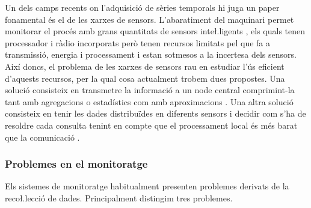 Un dels camps recents on l'adquisició de sèries temporals hi juga un
paper fonamental és el de les xarxes de sensors. L'abaratiment del
maquinari permet monitorar el procés amb grans quantitats de sensors
inte\l.ligents \parencite{jainagrawal05,yaogehrke02}, els quals tenen
processador i ràdio incorporats però tenen recursos limitats pel que
fa a transmissió, energia i processament i estan sotmesos a la
incertesa dels sensors. Així doncs, el problema de les xarxes de
sensors rau en estudiar l'ús eficient d'aquests recursos, per la qual
cosa actualment trobem dues propostes.  Una solució consisteix en
transmetre la informació a un node central comprimint-la tant amb
agregacions o estadístics com amb
aproximacions \parencite{deligiannakis07}.  Una altra solució
consisteix en tenir les dades distribuïdes en diferents sensors i
decidir com s'ha de resoldre cada consulta tenint en compte que el
processament local és més barat que la
comunicació \parencite{yaogehrke02,gehrkemadden04,bonnet01,kim12:aggregate_sensor_networks}.



\subsubsection{Problemes en el monitoratge}
\label{sec:art:problemes}

Els sistemes de monitoratge habitualment presenten problemes derivats
de la reco\l.lecció de dades. Principalment distingim tres problemes.


